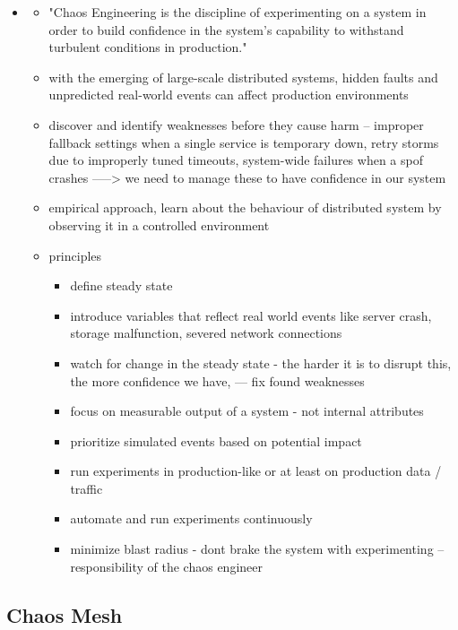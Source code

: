 \begin{itemize}
	\item \cite{PrinciplesOfChaos}
	\begin{itemize}
		\item "Chaos Engineering is the discipline of experimenting on a system in order to build confidence in the system’s capability to withstand turbulent conditions in production."
		\item with the emerging of large-scale distributed systems, hidden faults and unpredicted real-world events can affect production environments
		\item discover and identify weaknesses before they cause harm -- improper fallback settings when a single service is temporary down, retry storms due to improperly tuned timeouts, system-wide failures when a spof crashes -----> we need to manage these to have confidence in our system
		\item empirical approach, learn about the behaviour of distributed system by observing it in a controlled environment
		\item principles \begin{itemize}
			\item define steady state
			\item introduce variables that reflect real world events like server crash, storage malfunction, severed network connections
			\item watch for change in the steady state - the harder it is to disrupt this, the more confidence we have, --- fix found weaknesses
			\item focus on measurable output of a system - not internal attributes
			\item prioritize simulated events based on potential impact
			\item run experiments in production-like or at least on production data / traffic
			\item automate and run experiments continuously
			\item minimize blast radius - dont brake the system with experimenting -- responsibility of the chaos engineer
		\end{itemize}
	\end{itemize}
\end{itemize}

\subsection{Chaos Mesh} \label{background-chaos-mesh}

